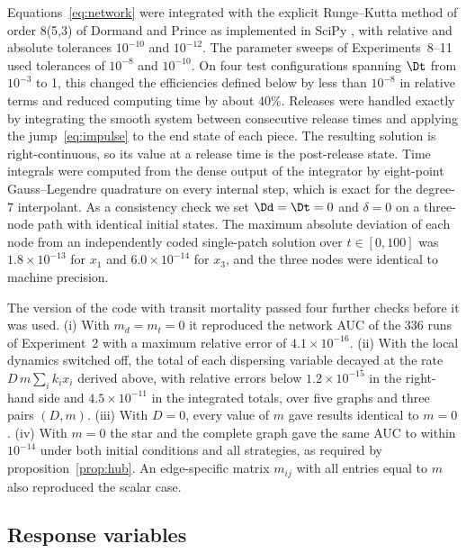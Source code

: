 Equations~\eqref{eq:network} were integrated with the explicit Runge--Kutta method of order 8(5,3) of Dormand and Prince as implemented in SciPy \citep{hairer1993,virtanen2020}, with relative and absolute tolerances $10^{-10}$ and $10^{-12}$. The parameter sweeps of Experiments~8--11 used tolerances of $10^{-8}$ and $10^{-10}$. On four test configurations spanning $\Dt$ from $10^{-3}$ to 1, this changed the efficiencies defined below by less than $10^{-8}$ in relative terms and reduced computing time by about 40\%. Releases were handled exactly by integrating the smooth system between consecutive release times and applying the jump~\eqref{eq:impulse} to the end state of each piece. The resulting solution is right-continuous, so its value at a release time is the post-release state. Time integrals were computed from the dense output of the integrator by eight-point Gauss--Legendre quadrature on every internal step, which is exact for the degree-7 interpolant. As a consistency check we set $\Dd = \Dt = 0$ and $\delta = 0$ on a three-node path with identical initial states. The maximum absolute deviation of each node from an independently coded single-patch solution over $t\in[0,100]$ was $1.8\times10^{-13}$ for $x_1$ and $6.0\times10^{-14}$ for $x_3$, and the three nodes were identical to machine precision.

The version of the code with transit mortality passed four further checks before it was used. (i) With $m_d = m_t = 0$ it reproduced the network AUC of the 336 runs of Experiment~2 with a maximum relative error of $4.1\times10^{-16}$. (ii) With the local dynamics switched off, the total of each dispersing variable decayed at the rate $D\,m\sum_i k_i x_i$ derived above, with relative errors below $1.2\times10^{-15}$ in the right-hand side and $4.5\times10^{-11}$ in the integrated totals, over five graphs and three pairs $(D, m)$. (iii) With $D = 0$, every value of $m$ gave results identical to $m = 0$. (iv) With $m = 0$ the star and the complete graph gave the same AUC to within $10^{-14}$ under both initial conditions and all strategies, as required by proposition~\ref{prop:hub}. An edge-specific matrix $m_{ij}$ with all entries equal to $m$ also reproduced the scalar case.

\subsection{Response variables}
\label{sec:metrics}

